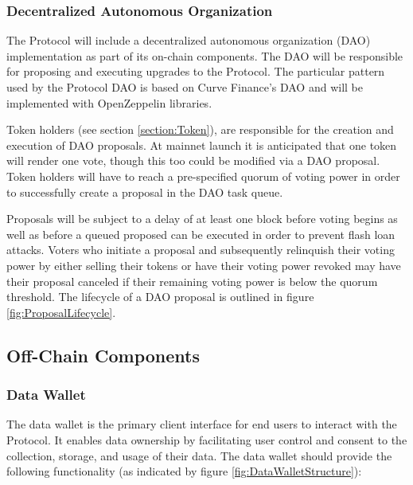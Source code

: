 \subsubsection{Decentralized Autonomous Organization}
\label{section:ImplementationDAO}


The Protocol will include a decentralized autonomous organization (DAO) implementation as part of its on-chain components. The DAO will be responsible for proposing and executing upgrades to 
the Protocol. The particular pattern used by the Protocol DAO is based on Curve Finance's DAO and will be implemented with OpenZeppelin libraries. 

Token holders (see section \ref{section:Token}), are responsible for the creation and execution of DAO proposals. At mainnet launch it is anticipated that one 
token will render one vote, though this too could be modified via a DAO proposal. Token holders will have to reach a pre-specified quorum of voting power in 
order to successfully create a proposal in the DAO task queue. 

Proposals will be subject to a delay of at least one block before voting begins as well as before a queued proposed can be executed 
in order to prevent flash loan attacks. Voters who initiate a proposal and subsequently relinquish their voting power by either selling their tokens or have their voting power revoked may have their proposal canceled if their remaining voting power is below the quorum threshold. The lifecycle of a DAO proposal is outlined in figure \ref{fig:ProposalLifecycle}.
\subsection{Off-Chain Components}
\label{section:OffChain}

\subsubsection{Data Wallet}
\label{section:DataWallet}



The data wallet is the primary client interface for end users to interact with the Protocol. It enables data ownership by facilitating user control 
and consent to the collection, storage, and usage of their data. The data wallet should provide the following functionality (as indicated 
by figure \ref{fig:DataWalletStructure}):

